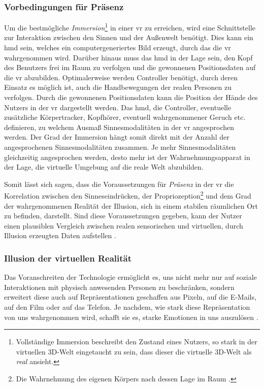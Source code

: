 \documentclass[a4paper,11pt]{article}%
\renewcommand{\\}{\vspace*{0.5\baselineskip} \newline}
\begin{document}
		\subsubsection{Vorbedingungen für Präsenz}
Um die bestmögliche \textit{Immersion}\footnote{Vollständige Immersion beschreibt den Zustand eines Nutzers, so stark in der virtuellen 3D-Welt eingetaucht zu sein, dass dieser die virtuelle 3D-Welt als \textit{real} ansieht.} in einer \ac{vr} zu erreichen, wird eine Schnittstelle zur Interaktion zwischen den Sinnen und der Außenwelt benötigt. Dies kann ein \ac{hmd} sein, welches ein computergeneriertes Bild erzeugt, durch das die \ac{vr} wahrgenommen wird. Darüber hinaus muss das \ac{hmd} in der Lage sein, den Kopf des Benutzers frei im Raum zu verfolgen und die gewonnenen Positionsdaten auf die \ac{vr} abzubilden. Optimalerweise werden Controller benötigt, durch deren Einsatz es möglich ist, auch die Handbewegungen der realen Personen zu verfolgen. Durch die gewonnenen Positionsdaten kann die Position der Hände des Nutzers in der \ac{vr} dargestellt werden. Das \ac{hmd}, die Controller, eventuelle zusätzliche Körpertracker, Kopfhörer, eventuell wahrgenommener Geruch etc. definieren, zu welchem Ausmaß Sinnesmodalitäten in der \ac{vr} angesprochen werden. Der Grad der Immersion hängt somit direkt mit der Anzahl der angesprochenen Sinnesmodalitäten zusammen. Je mehr Sinnesmodalitäten gleichzeitig angesprochen werden, desto mehr ist der Wahrnehmungsapparat in der Lage, die virtuelle Umgebung auf die reale Welt abzubilden.

Somit lässt sich sagen, dass die Voraussetzungen für \textit{Präsenz} in der \ac{vr} die Korrelation zwischen den Sinneseindrücken, der Propriozeption\footnote{Die Wahrnehmung des eigenen Körpers nach dessen Lage im Raum \citep[S. 23]{hafelinger2013koordinationstherapie}.} und dem Grad der wahrgenommenen Realität der Illusion, sich in einem stabilen räumlichen Ort zu befinden, darstellt. Sind diese Voraussetzungen gegeben, kann der Nutzer einen plausiblen Vergleich zwischen realen sensorischen und virtuellen, durch Illusion erzeugten Daten aufstellen \citep{slater2009we}.

		\subsubsection{Illusion der virtuellen Realität}
Das Voranschreiten der Technologie ermöglicht es, uns nicht mehr nur auf soziale Interaktionen mit physisch anwesenden Personen zu beschränken, sondern erweitert diese auch auf Repräsentationen geschaffen aus Pixeln, auf die E-Mails, auf den Film oder auf das Telefon. Je nachdem, wie stark diese Repräsentation von uns wahrgenommen wird, schafft sie es, starke Emotionen in uns auszulösen \citep[S. 4-6]{biocca2002defining}.
\end{document}
